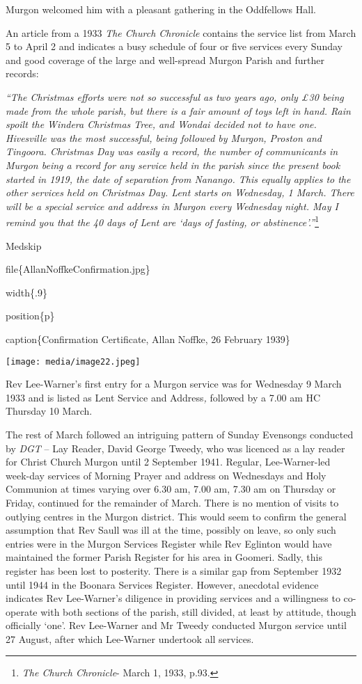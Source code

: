 Murgon welcomed him with a pleasant gathering in the Oddfellows Hall.

An article from a 1933 \emph{The Church Chronicle} contains the service list from March 5 to April 2 and indicates a busy schedule of four or five services every Sunday and good coverage of the large and well-spread Murgon Parish and further records:

\emph{``The Christmas efforts were not so successful as two years ago, only £30 being made from the whole parish, but there is a fair amount of toys left in hand. Rain spoilt the Windera Christmas Tree, and Wondai decided not to have one. Hivesville was the most successful, being followed by Murgon, Proston and Tingoora. Christmas Day was easily a record, the number of communicants in Murgon being a record for any service held in the parish since the present book started in 1919, the date of separation from Nanango. This equally applies to the other services held on Christmas Day. Lent starts on Wednesday, 1 March. There will be a special service and address in Murgon every Wednesday night. May I remind you that the 40 days of Lent are `days of fasting, or abstinence'.''}\footnote{\emph{The Church Chronicle}- March 1, 1933, p.93.}

Medskip

file\{AllanNoffkeConfirmation.jpg\}

width\{.9\}

position\{p\}

caption\{Confirmation Certificate, Allan Noffke, 26 February 1939\}

\texttt{[image: media/image22.jpeg]}

Rev Lee-Warner's first entry for a Murgon service was for Wednesday 9 March 1933 and is listed as Lent Service and Address\emph{,} followed by a 7.00 am HC Thursday 10 March.

The rest of March followed an intriguing pattern of Sunday Evensongs conducted by \emph{DGT} -- Lay Reader, David George Tweedy, who was licenced as a lay reader for Christ Church Murgon until 2 September 1941. Regular, Lee-Warner-led week-day services of Morning Prayer and address on Wednesdays and Holy Communion at times varying over 6.30 am, 7.00 am, 7.30 am on Thursday or Friday, continued for the remainder of March. There is no mention of visits to outlying centres in the Murgon district. This would seem to confirm the general assumption that Rev Saull was ill at the time, possibly on leave, so only such entries were in the Murgon Services Register while Rev Eglinton would have maintained the former Parish Register for his area in Goomeri. Sadly, this register has been lost to posterity. There is a similar gap from September 1932 until 1944 in the Boonara Services Register. However, anecdotal evidence indicates Rev Lee-Warner's diligence in providing services and a willingness to co-operate with both sections of the parish, still divided, at least by attitude, though officially `one'. Rev Lee-Warner and Mr Tweedy conducted Murgon service until 27 August, after which Lee-Warner undertook all services.

